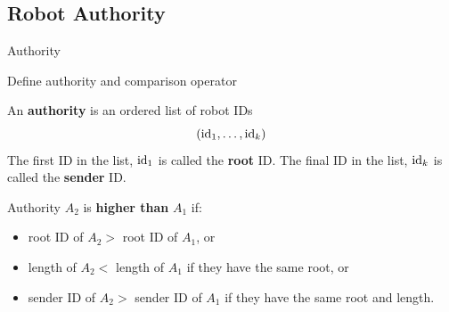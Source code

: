 \documentclass[10pt]{beamer}
\newcommand{\id}{{\rm id}}
\begin{document}
\subsection{Robot Authority}
\begin{frame}{Authority}
  \begin{block}{Define authority and comparison operator}
    \begin{bclogo}[logo=\bccrayon,couleur=orange!10, arrondi=0.1,
      ombre=true]{}
      \small{An \textbf{authority} is an ordered list of robot IDs
        $$(\id_1, \ldots, \id_k)$$
        The first ID in the list, $\id_1$ is called the \textbf{root} ID.
        The final ID in the list, $\id_k$ is called the \textbf{sender} ID.}
    \end{bclogo}
    \begin{bclogo}[logo=\bccrayon,couleur=orange!10, arrondi=0.1,
      ombre=true]{}
      \small{Authority $A_2$ is \textbf{higher than} $A_1$ if:}
      \begin{itemize}
      \item \small{root ID of $A_2 >$ root ID of $A_1$, or}
      \item \small{length of $A_2 <$  length of $A_1$ if they have the same root, or}
      \item \small{sender ID of $A_2 >$ sender ID of $A_1$ if they have the same root and length.}
      \end{itemize}
    \end{bclogo}
  
  \end{block}
\end{frame}

\end{document}
